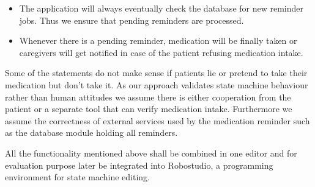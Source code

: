 \begin{itemize}
	\item The application will always eventually check the database for new reminder jobs. Thus we ensure that pending reminders are processed.
	\item Whenever there is a pending reminder, medication will be finally taken or caregivers will get notified in case of the patient refusing medication intake.
\end{itemize}

Some of the statements do not make sense if patients lie or pretend to take their medication but don't take it. As our approach validates state machine behaviour rather than human attitudes we assume there is either cooperation from the patient or a separate tool that can verify medication intake. Furthermore we assume the correctness of external services used by the medication reminder such as the database module holding all reminders.

All the functionality mentioned above shall be combined in one editor and for evaluation purpose later be integrated into Robostudio, a programming environment for state machine editing.